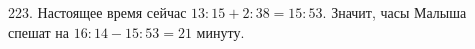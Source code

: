 223. Настоящее время сейчас $13:15+2:38=15:53.$ Значит, часы Малыша спешат на $16:14-15:53=21$ минуту.\\
